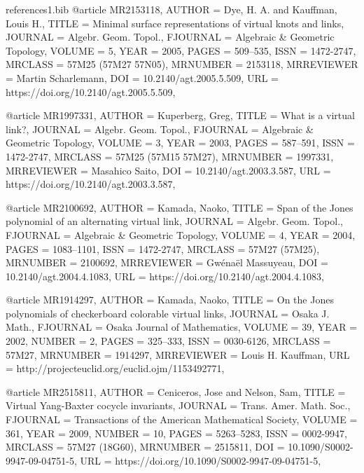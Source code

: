\documentclass[11pt, reqno]{amsart}
\theoremstyle{definition}
\begin{document}
\begin{filecontents*}[overwrite]{references1.bib}
@article {MR2153118,
    AUTHOR = {Dye, H. A. and Kauffman, Louis H.},
     TITLE = {Minimal surface representations of virtual knots and links},
   JOURNAL = {Algebr. Geom. Topol.},
  FJOURNAL = {Algebraic \& Geometric Topology},
    VOLUME = {5},
      YEAR = {2005},
     PAGES = {509--535},
      ISSN = {1472-2747},
   MRCLASS = {57M25 (57M27 57N05)},
  MRNUMBER = {2153118},
MRREVIEWER = {Martin Scharlemann},
       DOI = {10.2140/agt.2005.5.509},
       URL = {https://doi.org/10.2140/agt.2005.5.509},
}

@article {MR1997331,
    AUTHOR = {Kuperberg, Greg},
     TITLE = {What is a virtual link?},
   JOURNAL = {Algebr. Geom. Topol.},
  FJOURNAL = {Algebraic \& Geometric Topology},
    VOLUME = {3},
      YEAR = {2003},
     PAGES = {587--591},
      ISSN = {1472-2747},
   MRCLASS = {57M25 (57M15 57M27)},
  MRNUMBER = {1997331},
MRREVIEWER = {Masahico Saito},
       DOI = {10.2140/agt.2003.3.587},
       URL = {https://doi.org/10.2140/agt.2003.3.587},
}

@article {MR2100692,
    AUTHOR = {Kamada, Naoko},
     TITLE = {Span of the {J}ones polynomial of an alternating virtual link},
   JOURNAL = {Algebr. Geom. Topol.},
  FJOURNAL = {Algebraic \& Geometric Topology},
    VOLUME = {4},
      YEAR = {2004},
     PAGES = {1083--1101},
      ISSN = {1472-2747},
   MRCLASS = {57M27 (57M25)},
  MRNUMBER = {2100692},
MRREVIEWER = {Gw\'{e}na\"{e}l Massuyeau},
       DOI = {10.2140/agt.2004.4.1083},
       URL = {https://doi.org/10.2140/agt.2004.4.1083},
}

@article {MR1914297,
    AUTHOR = {Kamada, Naoko},
     TITLE = {On the {J}ones polynomials of checkerboard colorable virtual
              links},
   JOURNAL = {Osaka J. Math.},
  FJOURNAL = {Osaka Journal of Mathematics},
    VOLUME = {39},
      YEAR = {2002},
    NUMBER = {2},
     PAGES = {325--333},
      ISSN = {0030-6126},
   MRCLASS = {57M27},
  MRNUMBER = {1914297},
MRREVIEWER = {Louis H. Kauffman},
       URL = {http://projecteuclid.org/euclid.ojm/1153492771},
}
 
@article {MR2515811,
    AUTHOR = {Ceniceros, Jose and Nelson, Sam},
     TITLE = {Virtual {Y}ang-{B}axter cocycle invariants},
   JOURNAL = {Trans. Amer. Math. Soc.},
  FJOURNAL = {Transactions of the American Mathematical Society},
    VOLUME = {361},
      YEAR = {2009},
    NUMBER = {10},
     PAGES = {5263--5283},
      ISSN = {0002-9947},
   MRCLASS = {57M27 (18G60)},
  MRNUMBER = {2515811},
       DOI = {10.1090/S0002-9947-09-04751-5},
       URL = {https://doi.org/10.1090/S0002-9947-09-04751-5},
}



\end{filecontents*}
\end{document}
